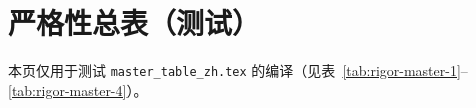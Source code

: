 

\chapter*{严格性总表（测试）}
本页仅用于测试 \texttt{master\_table\_zh.tex} 的编译（见表~\ref{tab:rigor-master-1}--\ref{tab:rigor-master-4}）。

\clearpage



